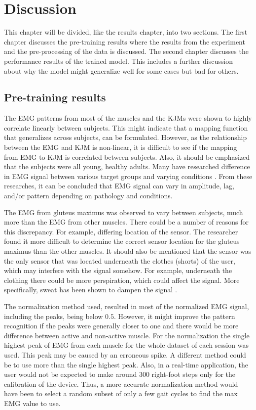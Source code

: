 \documentclass[../main.tex]{subfiles}
\begin{document}
\chapter{Discussion}
\label{sec:discussion}
This chapter will be divided, like the results chapter, into two sections. 
The first chapter discusses the pre-training results where the results from the experiment and the pre-processing of the data is discussed.
The second chapter discusses the performance results of the trained model.
This includes a further discussion about why the model might generalize well for some cases but bad for others.

\section{Pre-training results}
\label{sec:discussion_pre-training-results}
The \ac{EMG} patterns from most of the muscles and the \acp{KJM} were shown to highly correlate linearly between subjects.
This might indicate that a mapping function that generalizes across subjects, can be formulated.
However, as the relationship between the \ac{EMG} and \ac{KJM} is non-linear, it is difficult to see if the mapping from \ac{EMG} to \ac{KJM} is correlated between subjects.
Also, it should be emphasized that the subjects were all young, healthy adults.
Many have researched difference in \ac{EMG} signal between various target groups and varying conditions \cite{Courtine2003,Rezgui2013,Sacco2010, Zwaan2012}.
From these researches, it can be concluded that \ac{EMG} signal can vary in amplitude, lag, and/or pattern depending on pathology and conditions.

The \ac{EMG} from gluteus maximus was observed to vary between subjects, much more than the \ac{EMG} from other muscles.
There could be a number of reasons for this discrepancy.
For example, differing location of the sensor.
The researcher found it more difficult to determine the correct sensor location for the gluteus maximus than the other muscles.
It should also be mentioned that the sensor was the only sensor that was located underneath the clothes (shorts) of the user, which may interfere with the signal somehow.
For example, underneath the clothing there could be more perspiration, which could affect the signal.
More specifically, sweat has been shown to dampen the signal \cite{Abdoli-Eramaki2012}.

The normalization method used, resulted in most of the normalized \ac{EMG} signal, including the peaks, being below $0.5$.
However, it might improve the pattern recognition if the peaks were generally closer to one and there would be more difference between active and non-active muscle.
For the normalization the single highest peak of \ac{EMG} from each muscle for the whole dataset of each session was used.
This peak may be caused by an erroneous spike.
A different method could be to use more than the single highest peak.
Also, in a real-time application, the user would not be expected to make around $300$ right-foot steps only for the calibration of the device.
Thus, a more accurate normalization method would have been to select a random subset of only a few gait cycles to find the max \ac{EMG} value to use.
\end{document}
